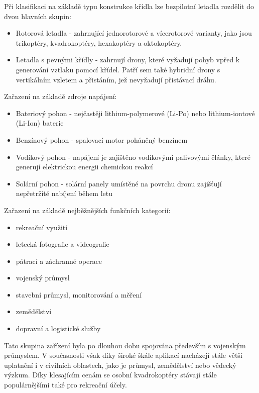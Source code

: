 \documentclass[12pt]{report}
\begin{document}
Při klasifikaci na základě typu konstrukce křídla lze bezpilotní letadla rozdělit do dvou hlavních skupin:
\begin{itemize}
	\item Rotorová letadla - zahrnující jednorotorové a vícerotorové varianty, jako jsou trikoptéry, kvadrokoptéry, hexakoptéry a oktokoptéry.
	\item Letadla s pevnými křídly - zahrnují drony, které vyžadují pohyb vpřed k generování vztlaku pomocí křídel. Patří sem také hybridní drony s vertikálním vzletem a přistáním, jež nevyžadují přistávací dráhu.
\end{itemize}

Zařazení na základě zdroje napájení:
\begin{itemize}
	\item Bateriový pohon - nejčastěji lithium-polymerové (Li-Po) nebo lithium-iontové (Li-Ion) baterie
	\item Benzínový pohon - spalovací motor poháněný benzínem
	\item Vodíkový pohon - napájení je zajištěno vodíkovými palivovými články, které generují elektrickou energii chemickou reakcí
	\item Solární pohon - solární panely umístěné na povrchu dronu zajišťují nepřetržité nabíjení během letu
\end{itemize}

Zařazení na základě nejběžnějších funkčních kategorií:
\begin{itemize}
	\item rekreační využití
	\item letecká fotografie a videografie
	\item pátrací a záchranné operace
	\item vojenský průmysl
	\item stavební průmysl, monitorování a měření
	\item zemědělství
	\item dopravní a logistické služby
\end{itemize}

Tato skupina zařízení byla po dlouhou dobu spojována především s vojenským průmyslem. V současnosti však díky široké škále aplikací nacházejí stále větší uplatnění i v civilních oblastech, jako je průmysl, zemědělství nebo vědecký výzkum. Díky klesajícím cenám se osobní kvadrokoptéry stávají stále populárnějšími také pro rekreační účely. \cite{mainbook} \cite{whatisadrone}\\
\end{document}
